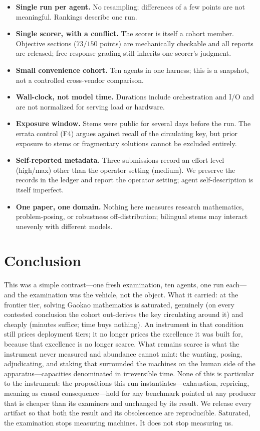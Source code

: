 \documentclass[11pt]{article}
\theoremstyle{plain}
\begin{document}
\begin{itemize}
  \item \textbf{Single run per agent.} No resampling; differences of a
        few points are not meaningful. Rankings describe one run.
  \item \textbf{Single scorer, with a conflict.} The scorer is itself a
        cohort member. Objective sections ($73/150$ points) are
        mechanically checkable and all reports are released; free-response
        grading still inherits one scorer's judgment.
  \item \textbf{Small convenience cohort.} Ten agents in one harness;
        this is a snapshot, not a controlled cross-vendor comparison.
  \item \textbf{Wall-clock, not model time.} Durations include
        orchestration and I/O and are not normalized for serving load or
        hardware.
  \item \textbf{Exposure window.} Stems were public for several days
        before the run. The errata control (F4) argues against recall of
        the circulating key, but prior exposure to stems or fragmentary
        solutions cannot be excluded entirely.
  \item \textbf{Self-reported metadata.} Three submissions record an
        effort level (high/max) other than the operator setting (medium).
        We preserve the records in the ledger and report the operator
        setting; agent self-description is itself imperfect.
  \item \textbf{One paper, one domain.} Nothing here measures research
        mathematics, problem-posing, or robustness off-distribution;
        bilingual stems may interact unevenly with different models.
\end{itemize}

\section{Conclusion}

This was a simple contrast---one fresh examination, ten agents, one run
each---and the examination was the vehicle, not the object. What it
carried: at the frontier tier, solving Gaokao mathematics is saturated,
genuinely (on every contested conclusion the cohort out-derives the key
circulating around it) and cheaply (minutes suffice; time buys nothing).
An instrument in that condition still prices deployment tiers; it no
longer prices the excellence it was built for, because that excellence is
no longer scarce. What remains scarce is what the instrument never
measured and abundance cannot mint: the wanting, posing, adjudicating,
and staking that surrounded the machines on the human side of the
apparatus---capacities denominated in irreversible time. None of this is
particular to the instrument: the propositions this run
instantiates---exhaustion, repricing, meaning as causal
consequence---hold for any benchmark pointed at any producer that is
cheaper than its examiners and unchanged by its result. We release every
artifact so that both the result and its obsolescence are reproducible.
Saturated, the examination stops measuring machines. It does not stop
measuring us.
\end{document}
